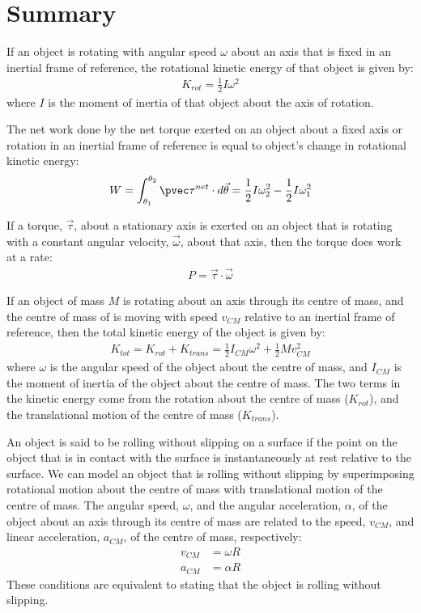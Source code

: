 \newpage
\section{Summary}

\begin{chapterSummary}
If an object is rotating with angular speed $\omega$ about an axis that is fixed in an inertial frame of reference, the rotational kinetic energy of that object is given by:
\begin{align*}
K_{rot} = \frac{1}{2}I\omega^2
\end{align*}
where $I$ is the moment of inertia of that object about the axis of rotation.

The net work done by the net torque exerted on an object about a fixed axis or rotation in an inertial frame of reference is equal to object's change in rotational kinetic energy:
\begin{align*}
W = \int_{\theta_1}^{\theta_2}\pvec \tau^{net}\cdot d\vec \theta = \frac{1}{2}I\omega_2^2 -\frac{1}{2}I\omega_1^2
\end{align*}

If a torque, $\vec \tau$, about a stationary axis is exerted on an object that is rotating with a constant angular velocity, $\vec \omega$, about that axis, then the torque does work at a rate:
\begin{align*}
P = \vec \tau \cdot \vec \omega
\end{align*}

If an object of mass $M$ is rotating about an axis through its centre of mass, and the centre of mass of is moving with speed $v_{CM}$ relative to an inertial frame of reference, then the total kinetic energy of the object is given by:
\begin{align*}
K_{tot} = K_{rot} + K_{trans} = \frac{1}{2}I_{CM}\omega^2+ \frac{1}{2}Mv_{CM}^2
\end{align*}
where $\omega$ is the angular speed of the object about the centre of mass, and $I_{CM}$ is the moment of inertia of the object about the centre of mass. The two terms in the kinetic energy come from the rotation about the centre of mass ($K_{rot}$), and the translational motion of the centre of mass ($K_{trans}$).

An object is said to be rolling without slipping on a surface if the point on the object that is in contact with the surface is instantaneously at rest relative to the surface. We can model an object that is rolling without slipping by superimposing rotational motion about the centre of mass with translational motion of the centre of mass. The angular speed, $\omega$, and the angular acceleration, $\alpha$, of the object about an axis through its centre of mass are related to the speed, $v_{CM}$, and linear acceleration, $a_{CM}$, of the centre of mass, respectively:
\begin{align*}
v_{CM} &= \omega R\\
a_{CM} &= \alpha R
\end{align*}
These conditions are equivalent to stating that the object is rolling without slipping.


\end{chapterSummary}
